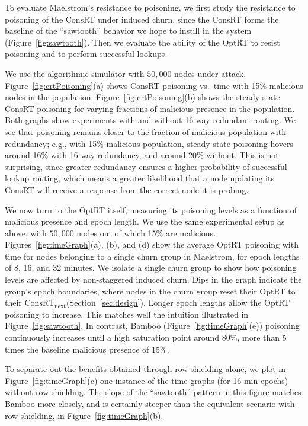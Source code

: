 \documentclass[10pt,twocolumn]{article}
\newcommand{\PRT}{OptRT\xspace}
\newcommand{\CRT}{ConsRT\xspace}
\newcommand{\CRTNext}{$\mathrm{\CRT}_{\mbox{next}}$\xspace}
\begin{document}

To evaluate Maelstrom's resistance to poisoning, we first study the
resistance to poisoning of the \CRT under induced churn, since the \CRT forms the baseline of the
``sawtooth'' behavior we hope to instill in the system
(Figure~\ref{fig:sawtooth}).  Then we evaluate the ability of the \PRT
to resist poisoning and to perform successful lookups.

We use the algorithmic simulator with $50,000$ nodes
under  attack. Figure~\ref{fig:crtPoisoning}(a) shows 
\CRT poisoning vs.\ time with 15\% malicious nodes in the population. 
Figure~\ref{fig:crtPoisoning}(b) shows the steady-state \CRT poisoning
for varying fractions of malicious presence in the population.  Both
graphs show experiments with and without 16-way redundant routing. We see that
poisoning remains closer to the fraction of malicious population with
redundancy; e.g., with 15\% malicious population, steady-state poisoning
hovers around 16\% with 16-way redundancy, and around 20\% without.
This is not surprising, since greater redundancy ensures a higher
probability of successful lookup routing, which means a greater
likelihood that a node updating its \CRT will receive a response from
the correct node it is probing.

We now turn to the \PRT itself, measuring its poisoning levels as a
function of malicious presence and epoch length. We use the same
experimental setup as above, with $50,000$ nodes out of which 15\% are
malicious. Figures~\ref{fig:timeGraph}(a), (b), and (d) show the
average \PRT
poisoning with time for nodes belonging to a single churn group in
Maelstrom, for epoch lengths of 8, 16, and 32 minutes.  We isolate a
single churn group to show how poisoning levels are affected by non-staggered
induced churn.
Dips in the graph indicate
the group's epoch boundaries, where nodes in the churn group reset their \PRT to their
\CRTNext (Section~\ref{sec:design}).  Longer epoch lengths allow the \PRT poisoning to increase.  This matches well
the intuition illustrated in Figure~\ref{fig:sawtooth}. 
In contrast, Bamboo (Figure~\ref{fig:timeGraph}(e)) poisoning 
continuously increases until a high saturation point around 80\%, more
than 5 times the baseline malicious presence of 15\%. 

To separate out the benefits obtained through row shielding alone, we
plot in Figure~\ref{fig:timeGraph}(c) one instance of the time graphs
(for 16-min epochs)
without row shielding.  The slope of the ``sawtooth'' pattern in this
figure matches Bamboo more closely, and is certainly steeper than the
equivalent scenario with
row shielding, in Figure~\ref{fig:timeGraph}(b).
\end{document}
